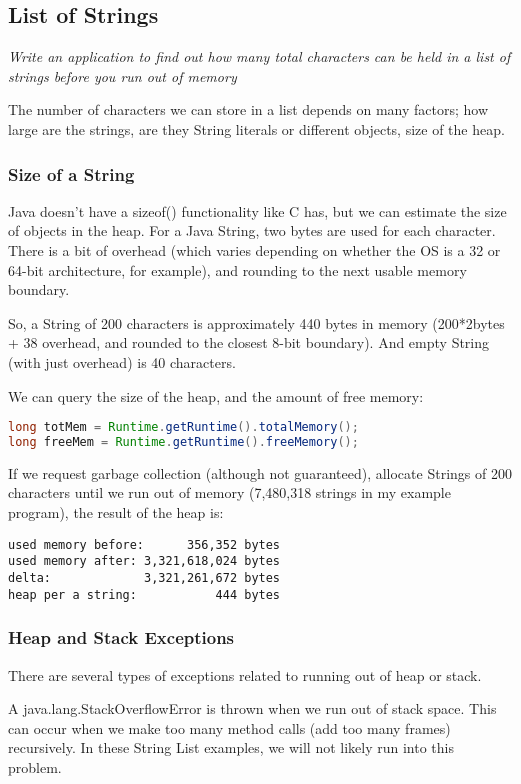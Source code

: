 \subsection{List of Strings}
\textit{Write an application to find out how many total characters can be held in a list of strings before you run out of memory}

The number of characters we can store in a list depends on many factors; how large are the strings, are they String literals or different objects, size of the heap. 

\subsubsection{Size of a String}

Java doesn't have a sizeof() functionality like C has, but we can estimate the size of objects in the heap. For a Java String, two bytes are used for each character. There is a bit of overhead (which varies depending on whether the OS is a 32 or 64-bit architecture, for example), and rounding to the next usable memory boundary.

So, a String of 200 characters is approximately 440 bytes in memory (200*2bytes + 38 overhead, and rounded to the closest 8-bit boundary). And empty String (with just overhead) is 40 characters.

We can query the size of the heap, and the amount of free memory:
\begin{lstlisting}[language=Java]
long totMem = Runtime.getRuntime().totalMemory();
long freeMem = Runtime.getRuntime().freeMemory();
\end{lstlisting}

If we request garbage collection (although not guaranteed), allocate Strings of 200 characters until we run out of memory (7,480,318 strings in my example program), the result of the heap is:
\begin{lstlisting}
used memory before:      356,352 bytes
used memory after: 3,321,618,024 bytes
delta:             3,321,261,672 bytes
heap per a string:           444 bytes
\end{lstlisting}


\subsubsection{Heap and Stack Exceptions}
There are several types of exceptions related to running out of heap or stack.

A java.lang.StackOverflowError is thrown when we run out of stack space. This can occur when we make too many method calls (add too many frames) recursively. In these String List examples, we will not likely run into this problem.

